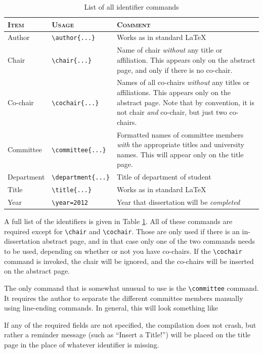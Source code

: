 \documentclass[thesis]{./tex/thesis-umich}
\begin{document}
\begin{table}
 \centering
 \small
 \begin{tabular}{l @{\hspace{16pt}} l @{\hspace{16pt}} p{6cm}}
  \hline \hline
  \textsc{Item} & \textsc{Usage} & \textsc{Comment} \\
  \hline
  Author      & \verb|\author{...}|
   & Works as in standard \LaTeX \\
  Chair       & \verb|\chair{...}|
   & Name of chair \emph{without} any title or affiliation.  This
     appears only on the abstract page, and only if there is no
     co-chair. \\
  Co-chair    & \verb|\cochair{...}|
   & Names of all co-chairs \emph{without} any titles or
     affiliations.  This appears only on the abstract page.  Note
     that by convention, it is not chair \emph{and} co-chair, but
     just two co-chairs. \\
  Committee   & \verb|\committee{...}|
   & Formatted names of committee members \emph{with} the
     appropriate titles and university names.  This will appear
     only on the title page. \\
  Department  & \verb|\department{...}|
   & Title of department of student \\
  Title       & \verb|\title{...}|
   & Works as in standard \LaTeX \\
  Year        & \verb|\year=2012|
   & Year that dissertation will be \emph{completed} \\
  \hline \hline
 \end{tabular}
 \caption{ \label{tab:identifiers}
  List of all identifier commands}
\end{table}

A full list of the identifiers is given in Table \ref{tab:identifiers}.
All of these commands are required except for \verb|\chair| and
\verb|\cochair|.  Those are only used if there is an in-dissertation
abstract page, and in that case only one of the two commands needs to
be used, depending on whether or not you have co-chairs.  If the
\verb|\cochair| command is invoked, the chair will be ignored, and the
co-chairs will be inserted on the abstract page.

The only command that is somewhat unusual to use is the
\verb|\committee| command.  It requires the author to separate the
different committee members manually using line-ending commands.  In
general, this will look something like
\begin{code}
\end{code}
If any of the required fields are not specified, the compilation does
not crash, but rather a reminder message (such as ``Insert a Title!'')
will be placed on the title page in the place of whatever identifier
is missing.
\end{document}
